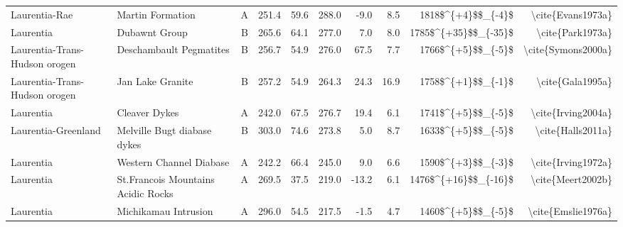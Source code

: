 \begin{longtable}{p{1 in}p{1 in}rrrrrrrr}
                 Laurentia-Rae &                                 Martin Formation &      A &     251.4 &      59.6 & 288.0 &  -9.0 &       8.5 &     1818\$\textasciicircum \{+4\}\$\$\_\{-4\}\$ &                                  \textbackslash cite\{Evans1973a\} \\
                     Laurentia &                                    Dubawnt Group &      B &     265.6 &      64.1 & 277.0 &   7.0 &       8.0 &   1785\$\textasciicircum \{+35\}\$\$\_\{-35\}\$ &                                   \textbackslash cite\{Park1973a\} \\
 Laurentia-Trans-Hudson orogen &                          Deschambault Pegmatites &      B &     256.7 &      54.9 & 276.0 &  67.5 &       7.7 &     1766\$\textasciicircum \{+5\}\$\$\_\{-5\}\$ &                                 \textbackslash cite\{Symons2000a\} \\
 Laurentia-Trans-Hudson orogen &                                 Jan Lake Granite &      B &     257.2 &      54.9 & 264.3 &  24.3 &      16.9 &     1758\$\textasciicircum \{+1\}\$\$\_\{-1\}\$ &                                   \textbackslash cite\{Gala1995a\} \\
                     Laurentia &                                    Cleaver Dykes &      A &     242.0 &      67.5 & 276.7 &  19.4 &       6.1 &     1741\$\textasciicircum \{+5\}\$\$\_\{-5\}\$ &                                 \textbackslash cite\{Irving2004a\} \\
           Laurentia-Greenland &                      Melville Bugt diabase dykes &      B &     303.0 &      74.6 & 273.8 &   5.0 &       8.7 &     1633\$\textasciicircum \{+5\}\$\$\_\{-5\}\$ &                                  \textbackslash cite\{Halls2011a\} \\
                     Laurentia &                          Western Channel Diabase &      A &     242.2 &      66.4 & 245.0 &   9.0 &       6.6 &     1590\$\textasciicircum \{+3\}\$\$\_\{-3\}\$ &                                 \textbackslash cite\{Irving1972a\} \\
                     Laurentia &               St.Francois Mountains Acidic Rocks &      A &     269.5 &      37.5 & 219.0 & -13.2 &       6.1 &   1476\$\textasciicircum \{+16\}\$\$\_\{-16\}\$ &                                  \textbackslash cite\{Meert2002b\} \\
                     Laurentia &                             Michikamau Intrusion &      A &     296.0 &      54.5 & 217.5 &  -1.5 &       4.7 &     1460\$\textasciicircum \{+5\}\$\$\_\{-5\}\$ &                                 \textbackslash cite\{Emslie1976a\} \\

\end{longtable}
